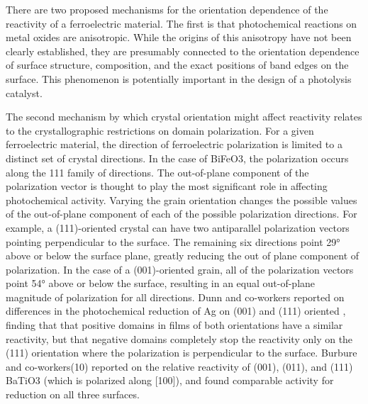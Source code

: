 \documentclass[12pt,%
              twoside,
               letterpaper]{uiothesis}
\begin{document}
There are two proposed mechanisms for the orientation dependence of the reactivity of a
ferroelectric material. The first is that photochemical reactions on metal oxides are
anisotropic.\cite{Giocondi:2003wc,Lowekamp:1998ks,MorrisHotsenpiller:1998jq,Ohno:2002fn,
Taguchi:2003hs} While the origins of this anisotropy have not been clearly established,
they are presumably connected to the orientation dependence of surface structure,
composition, and the exact positions of band edges on the surface.
\cite{Giocondi:2003wc,Giocondi:2007fa} This phenomenon is potentially important in the
design of a photolysis catalyst.\cite{Sosnowchik:2010jr}

The second mechanism by which crystal orientation might affect reactivity relates to the
crystallographic restrictions on domain polarization. For a given ferroelectric material,
the direction of ferroelectric polarization is limited to a distinct set of crystal
directions. In the case of BiFeO3, the polarization occurs along the 111 family of
directions.\cite{Anonymous:2011wx} The out-of-plane component of the polarization vector
is thought to play the most significant role in affecting photochemical activity. Varying
the grain orientation changes the possible values of the out-of-plane component of each of
the possible polarization directions. For example, a (111)-oriented crystal can have two
antiparallel polarization vectors pointing perpendicular to the surface. The remaining six
directions point 29\si{\degree} above or below the surface plane, greatly reducing the out
of plane component of polarization. In the case of a (001)-oriented grain, all of the
polarization vectors point 54\si{\degree} above or below the surface, resulting in an
equal out-of-plane magnitude of polarization for all directions. Dunn and
co-workers\cite{Dunn:2007cx} reported on differences in the photochemical reduction of Ag
on (001) and (111) oriented , finding that that positive domains in films of
both orientations have a similar reactivity, but that negative domains completely stop the
reactivity only on the (111) orientation where the polarization is perpendicular to the
surface. Burbure and co-workers(10) reported on the relative reactivity of (001), (011),
and (111) BaTiO3 (which is polarized along [100]), and found comparable activity for
reduction on all three surfaces.
\end{document}
